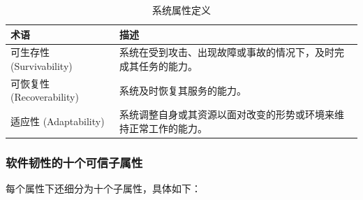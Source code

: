 \documentclass{article}
\begin{document}
\begin{table}[h!]
	\centering
	\begin{tabular}{p{3cm}p{10cm}}
		\toprule
		\textbf{术语}         & \textbf{描述}                                                                 \\
		\midrule
		可生存性 (Survivability)     & 系统在受到攻击、出现故障或事故的情况下，及时完成其任务的能力。       \\
		可恢复性 (Recoverability)    & 系统及时恢复其服务的能力。                                             \\
		适应性 (Adaptability)        & 系统调整自身或其资源以面对改变的形势或环境来维持正常工作的能力。       \\
		\bottomrule
	\end{tabular}
	\caption{系统属性定义}
	\label{tab:system_properties}
\end{table}

\subsubsection{软件韧性的十个可信子属性}

每个属性下还细分为十个子属性，具体如下：
\end{document}
